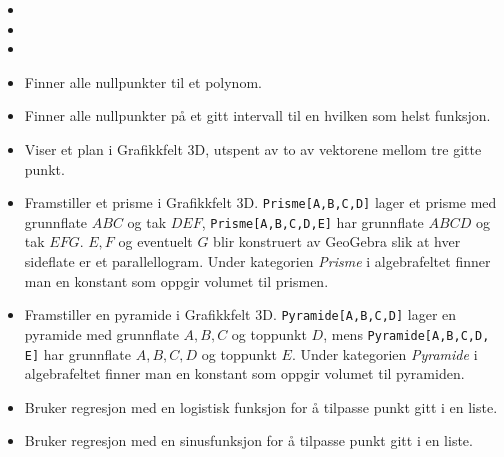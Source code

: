 \begin{itemize}
	\item {}	
	
	\item {}
	
	\item {}
	
	\item {}
	{Finner alle nullpunkter til et polynom.}
	
	\item {}
	{Finner alle nullpunkter på et gitt intervall til en hvilken som helst funksjon.}
	
	\item {}
	{Viser et plan i Grafikkfelt 3D, utspent av to av vektorene mellom tre gitte punkt.}
	
	\item {}
	{Framstiller et prisme i Grafikkfelt 3D. {\tt Prisme[A,B,C,D]} lager et prisme med grunnflate $ ABC $ og tak $ DEF $, {\tt Prisme[A,B,C,D,E]} har grunnflate $ ABCD $ og tak $ EFG $. $ E, F$ og eventuelt $ G $ blir konstruert av GeoGebra slik at hver sideflate er et parallellogram. Under kategorien \textsl{Prisme} i algebrafeltet finner man en konstant som oppgir volumet til prismen.}
	
	\item {}
	{Framstiller en pyramide i Grafikkfelt 3D. {\tt Pyramide[A,B,C,D]} lager en pyramide med grunnflate ${ A, B, C} $ og toppunkt $ D $, mens {\tt Pyramide[A,B,C,D, E]} har grunnflate ${ A, B, C, D }$ og toppunkt $ E $. Under kategorien \textsl{Pyramide} i algebrafeltet finner man en konstant som oppgir volumet til pyramiden.}
	
	\item {}
	{Bruker regresjon med en logistisk funksjon for å tilpasse punkt gitt i en liste.}
	
	\item {}
	{Bruker regresjon med en sinusfunksjon for å tilpasse punkt gitt i en liste.}
	

\end{itemize}
